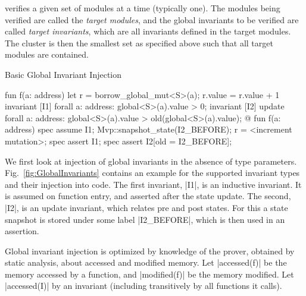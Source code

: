 
\MVP verifies a given set of modules at a time (typically one).  The modules
being verified are called the \textit{target modules}, and the global invariants
to be verified are called \textit{target invariants}, which are all invariants
defined in the target modules. The cluster is then the smallest set as specified
above such that all target modules are contained.


\begin{Figure}
  \caption{Basic Global Invariant Injection}
  \label{fig:GlobalInvariants}
  \centering
\begin{MoveBox}
  fun f(a: address) {
    let r = borrow_global_mut<S>(a);
    r.value = r.value + 1
  }
  invariant [I1] forall a: address: global<S>(a).value > 0;
  invariant [I2] update forall a: address:
      global<S>(a).value > old(global<S>(a).value);
  @\transform@
  fun f(a: address) {
    spec assume I1;
    Mvp::snapshot_state(I2_BEFORE);
    r = <increment mutation>;
    spec assert I1;
    spec assert I2[old = I2_BEFORE];
  }
\end{MoveBox}
\end{Figure}


We first look at injection of global invariants in the absence of
type parameters. Fig.~\ref{fig:GlobalInvariants} contains an
example for the supported invariant types and their injection into code. The
first invariant, |I1|, is an inductive invariant. It is assumed on function
entry, and asserted after the state update. The second, |I2|, is an update
invariant, which relates pre and post states. For this a state snapshot is
stored under some label |I2_BEFORE|, which is then used in an assertion.

Global invariant injection is optimized by knowledge of the prover, obtained by
static analysis, about accessed and modified memory.  Let |accessed(f)| be the
memory accessed by a function, and |modified(f)| be the memory modified. Let
|accessed(I)| by an invariant (including transitively by all functions it
calls).

